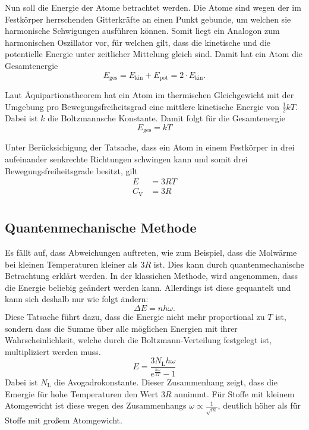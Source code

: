 Nun soll die Energie der Atome betrachtet werden. Die Atome sind wegen der im Festkörper herrschenden Gitterkräfte an einen Punkt gebunde, um welchen sie harmonische Schwigungen ausführen können. Somit liegt ein Analogon zum harmonischen Oszillator vor, für welchen gilt, dass die kinetische und die potentielle Energie unter zeitlicher Mittelung gleich sind. Damit hat ein Atom die Gesamtenergie
\begin{equation}
  E_\mathrm{ges} = E_\mathrm{kin} + E_\mathrm{pot} = 2 \cdot E_\mathrm{kin}.
\end{equation}

Laut Äquipartionstheorem hat ein Atom im thermischen Gleichgewicht mit der Umgebung pro Bewegungsfreiheitsgrad eine mittlere kinetische Energie von $\frac{1}{2}kT$. Dabei ist $k$ die Boltzmannsche Konstante. Damit folgt für die Gesamtenergie
\begin{equation}
    E_\mathrm{ges} = kT
\end{equation}

Unter Berücksichigung der Tatsache, dass ein Atom in einem Festkörper in drei aufeinander senkrechte Richtungen schwingen kann und somit drei Bewegungsfreiheitsgrade besitzt, gilt
\begin{align}
  E &= 3RT \\
  C_\mathrm{V} &= 3R \\
\end{align}

\subsection{Quantenmechanische Methode}
Es fällt auf, dass Abweichungen auftreten, wie zum Beispiel, dass die Molwärme bei kleinen Temperaturen kleiner als $3R$ ist. Dies kann durch quantenmechanische Betrachtung erklärt werden. In der klassichen Methode, wird angenommen, dass die Energie beliebig geändert werden kann. Allerdings ist diese gequantelt und kann sich deshalb nur wie folgt ändern:
\begin{equation}
  \Delta E = nh\omega.
\end{equation}
Diese Tatsache führt dazu, dass die Energie nicht mehr proportional zu $T$ ist, sondern dass die Summe über alle möglichen Energien mit ihrer Wahrscheinlichkeit, welche durch die Boltzmann-Verteilung festgelegt ist, multipliziert werden muss.
\begin{equation}
  E = \frac{3N_\mathrm{L}h\omega}{e^{\frac{h\omega}{kT}}-1}
\end{equation}
Dabei ist $N_\mathrm{L}$ die Avogadrokonstante.
Dieser Zusammenhang zeigt, dass die Emergie für hohe Temperaturen den Wert $3R$ annimmt. Für Stoffe mit kleinem Atomgewicht ist diese wegen des Zusammenhangs $\omega \propto \frac{1}{\sqrt{m}}$, deutlich höher als für Stoffe mit großem Atomgewicht.
